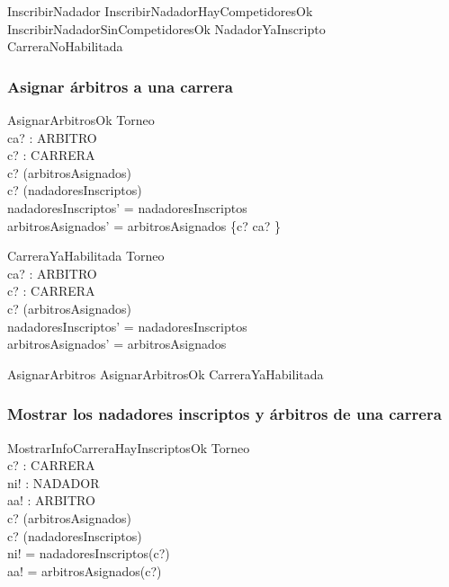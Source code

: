 \documentclass{article}
\begin{document}
\begin{zed}
InscribirNadador  InscribirNadadorHayCompetidoresOk \lor InscribirNadadorSinCompetidoresOk \lor NadadorYaInscripto \\
\lor CarreraNoHabilitada
\end{zed}

\subsubsection*{Asignar árbitros a una carrera}

\begin{schema}{AsignarArbitrosOk}
\Delta Torneo \\
ca? : \power ARBITRO \\
c? : CARRERA \\
\where
c? \notin \dom(arbitrosAsignados) \\
c? \notin \dom(nadadoresInscriptos) \\
nadadoresInscriptos' = nadadoresInscriptos \\
arbitrosAsignados' = arbitrosAsignados \cup \{c? \mapsto ca? \}
\end{schema}

\begin{schema}{CarreraYaHabilitada}
\Xi Torneo \\
ca? : \power ARBITRO \\
c? : CARRERA \\
\where
c? \in \dom(arbitrosAsignados) \\
nadadoresInscriptos' = nadadoresInscriptos \\
arbitrosAsignados' = arbitrosAsignados
\end{schema}

\begin{zed}
AsignarArbitros  AsignarArbitrosOk \lor CarreraYaHabilitada
\end{zed}

\subsubsection*{Mostrar los nadadores inscriptos y árbitros de una carrera}

\begin{schema}{MostrarInfoCarreraHayInscriptosOk}
\Xi Torneo \\
c? : CARRERA \\
ni! : \power NADADOR \\
aa! : \power ARBITRO \\
\where
c? \in \dom(arbitrosAsignados) \\
c? \in \dom(nadadoresInscriptos) \\
ni! = nadadoresInscriptos(c?) \\
aa! = arbitrosAsignados(c?)
\end{schema}
\end{document}
